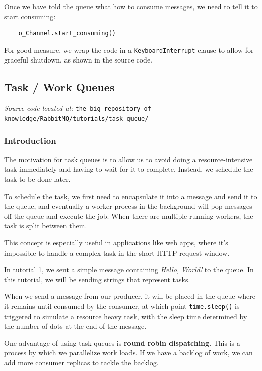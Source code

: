 \documentclass{article}
\begin{document}
Once we have told the queue what how to consume messages, we need to tell it to start consuming:

\begin{verbatim}
    o_Channel.start_consuming()
\end{verbatim}

For good measure, we wrap the code in a \verb|KeyboardInterrupt| clause to allow for graceful shutdown, as shown in the source code.

\subsection{Task / Work Queues}

\textit{Source code located at}: \verb|the-big-repository-of-knowledge/RabbitMQ/tutorials/task_queue/|

\subsubsection{Introduction}

The motivation for task queues is to allow us to avoid doing a resource-intensive task immediately and having to wait for it to complete. Instead, we schedule the task to be done later.

To schedule the task, we first need to encapsulate it into a message and send it to the queue, and eventually a worker process in the background will pop messages off the queue and execute the job. When there are multiple running workers, the task is split between them.

This concept is especially useful in applications like web apps, where it's impossible to handle a complex task in the short HTTP request window.

In tutorial 1, we sent a simple message containing \textit{Hello, World!} to the queue. In this tutorial, we will be sending strings that represent tasks. 

When we send a message from our producer, it will be placed in the queue where it remains until consumed by the consumer, at which point \verb|time.sleep()| is triggered to simulate a resource heavy task, with the sleep time determined by the number of dots at the end of the message.

One advantage of using task queues is \textbf{round robin dispatching}. This is a process by which we parallelize work loads. If we have a backlog of work, we can add more consumer replicas to tackle the backlog.
\end{document}
